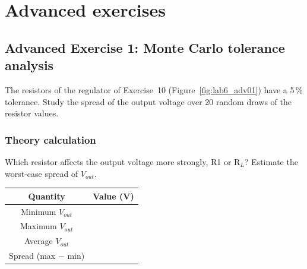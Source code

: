 

\newpage
\section{Advanced exercises}

\subsection{Advanced Exercise 1: Monte Carlo tolerance analysis}
The resistors of the regulator of Exercise~10 (Figure~\ref{fig:lab6_adv01}) have a 5\,\% tolerance. Study the spread of the output voltage over 20 random draws of the resistor values.


\subsubsection{Theory calculation}\vspace{-3pt}\notesblock Which resistor affects the output voltage more strongly, R1 or R$_L$? Estimate the worst-case spread of $V_{out}$.

\begin{center}\renewcommand{\arraystretch}{1.8}\begin{tabular}{|c|c|}\hline \textbf{Quantity} & \textbf{Value (V)}\\ \hline Minimum $V_{out}$ & \\ \hline Maximum $V_{out}$ & \\ \hline Average $V_{out}$ & \\ \hline Spread (max $-$ min) & \\ \hline \end{tabular}\end{center}
\newpage


